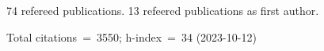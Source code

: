 74 refereed publications. 13 refeered publications as first author.

Total citations~=~3550; h-index~=~34 (2023-10-12)